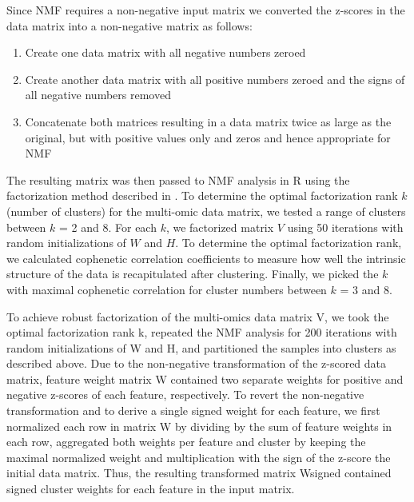 Since NMF requires a non-negative input matrix we converted the z-scores in the data matrix into a non-negative matrix as follows:
\begin{enumerate}
    \tightlist
    \item Create one data matrix with all negative numbers zeroed
    \item Create another data matrix with all positive numbers zeroed and the signs of all negative numbers removed
    \item Concatenate both matrices resulting in a data matrix twice as large as the original, but with positive values only and zeros and hence appropriate for NMF
\end{enumerate}

The resulting matrix was then passed to NMF analysis in R using the factorization method described in \cite{brunetjp_mesirovjp:MetagenesMolecular2004}. To determine the optimal factorization rank $k$ (number of clusters) for the multi-omic data matrix, we tested a range of clusters between $k$ = 2 and 8. For each $k$, we factorized matrix $V$ using 50 iterations with random initializations of $W$ and $H$. To determine the optimal factorization rank, we calculated cophenetic correlation coefficients to measure how well the intrinsic structure of the data is recapitulated after clustering. Finally, we picked the $k$ with maximal cophenetic correlation for cluster numbers between $k$ = 3 and 8.

To achieve robust factorization of the multi-omics data matrix V, we took the optimal factorization rank k, repeated the NMF analysis for 200 iterations with random initializations of W and H, and partitioned the samples into clusters as described above. Due to the non-negative transformation of the z-scored data matrix, feature weight matrix W contained two separate weights for positive and negative z-scores of each feature, respectively. To revert the non-negative transformation and to derive a single signed weight for each feature, we first normalized each row in matrix W by dividing by the sum of feature weights in each row, aggregated both weights per feature and cluster by keeping the maximal normalized weight and multiplication with the sign of the z-score the initial data matrix. Thus, the resulting transformed matrix Wsigned contained signed cluster weights for each feature in the input matrix.

